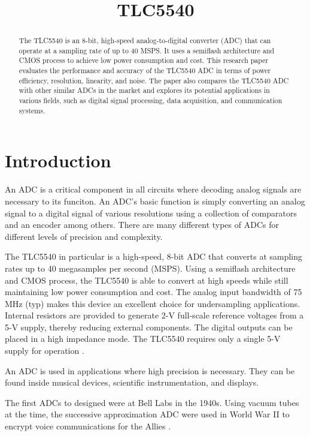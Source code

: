 \documentclass[conference]{IEEEtran}
\begin{document}
\title{TLC5540 \\
}

\author{
}

\maketitle

\begin{abstract}

The TLC5540 is an 8-bit, high-speed analog-to-digital converter (ADC) that can operate at a sampling rate of up to 40 MSPS. It uses a semiflash architecture and CMOS process to achieve low power consumption and cost. This research paper evaluates the performance and accuracy of the TLC5540 ADC in terms of power efficiency, resolution, linearity, and noise. The paper also compares the TLC5540 ADC with other similar ADCs in the market and explores its potential applications in various fields, such as digital signal processing, data acquisition, and communication systems.

\end{abstract}

\section{Introduction}

An ADC is a critical component in all circuits where decoding analog signals are necessary to its funciton. An ADC's basic function is simply converting an analog signal to a digital signal of various resolutions using a collection of comparators and an encoder among others. There are many different types of ADCs for different levels of precision and complexity. \par
The TLC5540 in particular is a high-speed, 8-bit ADC that converts at sampling rates up to 40 megasamples per second (MSPS). Using a semiflash architecture and CMOS process, the TLC5540 is able to convert at high speeds while still maintaining low power consumption and cost. The analog input bandwidth of 75 MHz (typ) makes this device an excellent choice for undersampling applications. Internal resistors are provided to generate 2-V full-scale reference voltages from a 5-V supply, thereby reducing external components. The digital outputs can be placed in a high impedance mode. The TLC5540 requires only a single 5-V supply for operation \cite{b1}. \par
An ADC is used in applications where high precision is necessary. They can be found inside musical devices, scientific instrumentation, and displays. \par
The first ADCs to designed were at Bell Labs in the 1940s. Using vacuum tubes at the time, the successive approximation ADC were used in World War II to encrypt voice communications for the Allies \cite{b2}.
\end{document}
